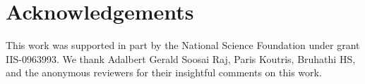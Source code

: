 \section{Acknowledgements}
This work was supported in part by the National Science Foundation under grant IIS-0963993. 
We thank Adalbert Gerald Soosai Raj, Paris Koutris, Bruhathi HS, and the anonymous reviewers for their insightful comments on this work.